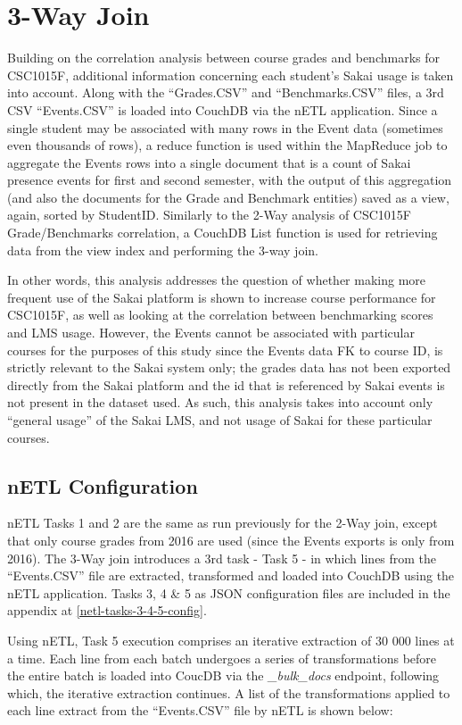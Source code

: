 \section{3-Way Join}
Building on the correlation analysis between course grades and benchmarks for CSC1015F, additional information concerning each student's Sakai usage is taken into account. Along with the ``Grades.CSV'' and ``Benchmarks.CSV'' files, a 3rd CSV ``Events.CSV'' is loaded into CouchDB via the nETL application. Since a single student may be associated with many rows in the Event data (sometimes even thousands of rows), a reduce function is used within the MapReduce job to aggregate the Events rows into a single document that is a count of Sakai presence events for first and second semester, with the output of this aggregation (and also the documents for the Grade and Benchmark entities) saved as a view, again, sorted by StudentID. Similarly to the 2-Way analysis of CSC1015F Grade/Benchmarks correlation, a CouchDB List function is used for retrieving data from the view index and performing the 3-way join.

In other words, this analysis addresses the question of whether making more frequent use of the Sakai platform is shown to increase course performance for CSC1015F, as well as looking at the correlation between benchmarking scores and LMS usage. However, the Events cannot be associated with particular courses for the purposes of this study since the Events data FK to course ID, is strictly relevant to the Sakai system only; the grades data has not been exported directly from the Sakai platform and the id that is referenced by Sakai events is not present in the dataset used. As such, this analysis takes into account only ``general usage'' of the Sakai LMS, and not usage of Sakai for these particular courses.

\subsection{nETL Configuration}
nETL Tasks 1 and 2 are the same as run previously for the 2-Way join, except that only course grades from 2016 are used (since the Events exports is only from 2016). The 3-Way join introduces a 3rd task - Task 5 - in which lines from the ``Events.CSV'' file are extracted, transformed and loaded into CouchDB using the nETL application. Tasks 3, 4 \& 5 as JSON configuration files are included in the appendix at \ref{netl-tasks-3-4-5-config}.

Using nETL, Task 5 execution comprises an iterative extraction of 30 000 lines at a time. Each line from each batch undergoes a series of transformations before the entire batch is loaded into CoucDB via the \textit{\_bulk\_docs} endpoint, following which, the iterative extraction continues. A list of the transformations applied to each line extract from the ``Events.CSV'' file by nETL is shown below:

